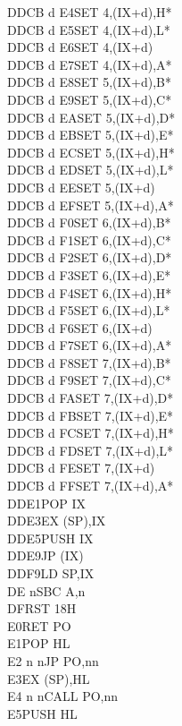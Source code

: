 \documentclass[oneside,a4paper]{book}
\begin{document}
\begin{multicols}{3}
{\begin{tabbing}
DDCB d E4\>SET 4,(IX+d),H*\\
DDCB d E5\>SET 4,(IX+d),L*\\
DDCB d E6\>SET 4,(IX+d)\\
DDCB d E7\>SET 4,(IX+d),A*\\
DDCB d E8\>SET 5,(IX+d),B*\\
DDCB d E9\>SET 5,(IX+d),C*\\
DDCB d EA\>SET 5,(IX+d),D*\\
DDCB d EB\>SET 5,(IX+d),E*\\
DDCB d EC\>SET 5,(IX+d),H*\\
DDCB d ED\>SET 5,(IX+d),L*\\
DDCB d EE\>SET 5,(IX+d)\\
DDCB d EF\>SET 5,(IX+d),A*\\
DDCB d F0\>SET 6,(IX+d),B*\\
DDCB d F1\>SET 6,(IX+d),C*\\
DDCB d F2\>SET 6,(IX+d),D*\\
DDCB d F3\>SET 6,(IX+d),E*\\
DDCB d F4\>SET 6,(IX+d),H*\\
DDCB d F5\>SET 6,(IX+d),L*\\
DDCB d F6\>SET 6,(IX+d)\\
DDCB d F7\>SET 6,(IX+d),A*\\
DDCB d F8\>SET 7,(IX+d),B*\\
DDCB d F9\>SET 7,(IX+d),C*\\
DDCB d FA\>SET 7,(IX+d),D*\\
DDCB d FB\>SET 7,(IX+d),E*\\
DDCB d FC\>SET 7,(IX+d),H*\\
DDCB d FD\>SET 7,(IX+d),L*\\
DDCB d FE\>SET 7,(IX+d)\\
DDCB d FF\>SET 7,(IX+d),A*\\
DDE1\>POP IX\\
DDE3\>EX (SP),IX\\
DDE5\>PUSH IX\\
DDE9\>JP (IX)\\
DDF9\>LD SP,IX\\
DE n\>SBC A,n\\
DF\>RST 18H\\
E0\>RET PO\\
E1\>POP HL\\
E2 n n\>JP PO,nn\\
E3\>EX (SP),HL\\
E4 n n\>CALL PO,nn\\
E5\>PUSH HL\\

\end{tabbing}}
\end{multicols}
\end{document}
